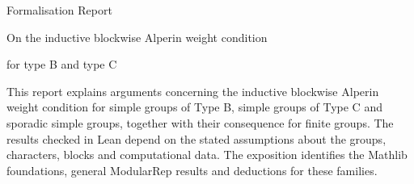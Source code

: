 \documentclass[11pt,oneside]{book}
\begin{document}
\frontmatter
\begin{titlepage}
\centering
\vspace*{24mm}
{\Huge Formalisation Report\par}
\vspace{12mm}
{\Large On the inductive blockwise Alperin weight condition\par
for type B and type C\par}
\vfill
\begin{minipage}{0.85\textwidth}
This report explains arguments concerning the inductive blockwise
Alperin weight condition for simple groups of Type B, simple groups of
Type C and sporadic simple groups, together with their consequence for
finite groups. The results checked in Lean depend on the stated assumptions about
the groups, characters, blocks and computational data. The exposition
identifies the Mathlib foundations, general ModularRep results and
deductions for these families.
\end{minipage}
\vspace{18mm}
\end{titlepage}
\tableofcontents
\mainmatter






\appendix



\backmatter

\end{document}
